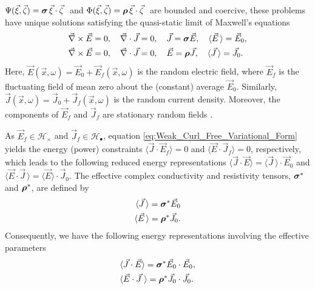 \documentclass{cmslatex}
\newcommand\bsig{\mbox{\boldmath${\sigma}$}}
\newcommand\brho{\mbox{\boldmath${\rho}$}}
\begin{document}
$\Psi(\vec{\xi},\vec{\zeta})=\bsig\,\vec{\xi}\cdot\vec{\zeta}\;$ and
$\Phi(\vec{\xi},\vec{\zeta})=\brho\,\vec{\xi}\cdot\vec{\zeta}\;$ are bounded and
coercive, these problems have unique solutions
\cite{Golden:CMP-473,Papanicolaou:RF-835} satisfying the quasi-static
limit of Maxwell's equations  \cite{Jackson-1999} 
%
\begin{align}   \label{eq:Maxwells_Equations_E}  
 &\vec{\nabla}\times\vec{E}=0, \quad
  \vec{\nabla}\cdot\vec{J}=0,\quad
  \vec{J}=\bsig\vec{E},\quad
  \langle\vec{E}\,\rangle=\vec{E}_0, \\
%
   &\vec{\nabla}\times\vec{E}=0, \quad
   \vec{\nabla}\cdot\vec{J}=0, \quad
   \vec{E}=\brho\vec{J},\quad
   \langle\vec{J}\,\rangle=\vec{J}_0.
   \notag  
\end{align}
%
Here, $\vec{E}(\vec{x},\omega)=\vec{E}_0+\vec{E}_f(\vec{x},\omega)$ is the
random electric field, where $\vec{E}_f$ is the fluctuating field of
mean zero about the (constant) average $\vec{E}_0$. Similarly,
$\vec{J}(\vec{x},\omega)=\vec{J}_0+\vec{J}_f(\vec{x},\omega)$ is the random  
current density. Moreover, the components of $\vec{E}_f$ and
$\vec{J}_f$ are stationary random fields \cite{Golden:CMP-473}. 




As $\vec{E}_f\in\mathscr{H}_\times$ and $\vec{J}_f\in\mathscr{H}_\bullet$, equation
\eqref{eq:Weak_Curl_Free_Variational_Form} yields the energy (power)
\cite{Jackson-1999} constraints $\langle\vec{J}\cdot\vec{E}_f\rangle=0$ and
$\langle\vec{E}\cdot\vec{J}_f\rangle=0$, respectively, which leads to the following
reduced energy representations $\langle\vec{J}\cdot\vec{E}\rangle=\langle\vec{J}\,\rangle\cdot\vec{E}_0$
and $\langle\vec{E}\cdot\vec{J}\,\rangle=\langle\vec{E}\rangle\cdot\vec{J}_0$. The effective complex
conductivity and resistivity tensors, $\bsig^*$ and $\brho^*$, are
defined by   
%
\begin{align}\label{eq:eff_eps_def}
    \langle \vec{J} \,\rangle=  \bsig^* \vec{E}_0
    \\
    \langle \vec{E} \,\rangle=  \brho^*\vec{J}_0.
    \notag
\end{align}
%
Consequently, we have the following energy representations involving
the effective parameters 
%
\begin{align}\label{eq:Energy_Reps}
  &\langle\vec{J}\cdot\vec{E}\rangle=\bsig^*\vec{E}_0\cdot\vec{E}_0,
  \\
  &\langle\vec{E}\cdot\vec{J}\;\rangle=\brho^*\vec{J}_0\cdot\vec{J}_0.
  \notag
\end{align}
%
\end{document}
